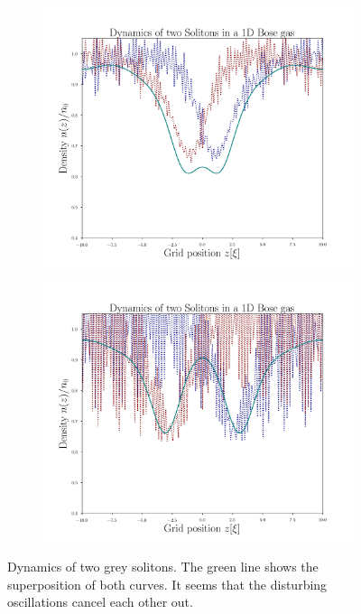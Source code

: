 \begin{figure}[H]
\begin{subfigure}{0.42\textwidth}
 \end{subfigure}
 \begin{subfigure}{0.42\textwidth} 
 	\includegraphics[width= \textwidth]{figures/two_grey_3_5_600}
 \end{subfigure}
 \begin{subfigure}{0.42\textwidth} 
 	\includegraphics[width= \textwidth]{figures/two_grey_3_5_800}
 \end{subfigure}

 \caption{Dynamics of two grey solitons. The green line shows the superposition of both curves. It seems that the disturbing oscillations cancel each other out.}	
 \end{figure}